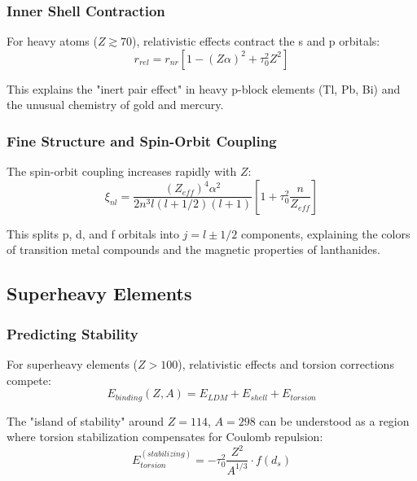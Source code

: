 \subsubsection{Inner Shell Contraction}

For heavy atoms ($Z \gtrsim 70$), relativistic effects contract the s and p orbitals:
\begin{equation}
    r_{rel} = r_{nr} \left[1 - (Z\alpha)^2 + \tau_0^2 Z^2\right]
\end{equation}

This explains the "inert pair effect" in heavy p-block elements (Tl, Pb, Bi) and the unusual chemistry of gold and mercury.

\subsubsection{Fine Structure and Spin-Orbit Coupling}

The spin-orbit coupling increases rapidly with $Z$:
\begin{equation}
    \xi_{nl} = \frac{(Z_{eff})^4 \alpha^2}{2n^3l(l+1/2)(l+1)} \left[1 + \tau_0^2 \frac{n}{Z_{eff}}\right]
\end{equation}

This splits p, d, and f orbitals into $j = l \pm 1/2$ components, explaining the colors of transition metal compounds and the magnetic properties of lanthanides.

\subsection{Superheavy Elements}

\subsubsection{Predicting Stability}

For superheavy elements ($Z > 100$), relativistic effects and torsion corrections compete:
\begin{equation}
    E_{binding}(Z, A) = E_{LDM} + E_{shell} + E_{torsion}
\end{equation}

The "island of stability" around $Z = 114$, $A = 298$ can be understood as a region where torsion stabilization compensates for Coulomb repulsion:
\begin{equation}
    E_{torsion}^{(stabilizing)} = -\tau_0^2 \frac{Z^2}{A^{1/3}} \cdot f(d_s)
\end{equation}

